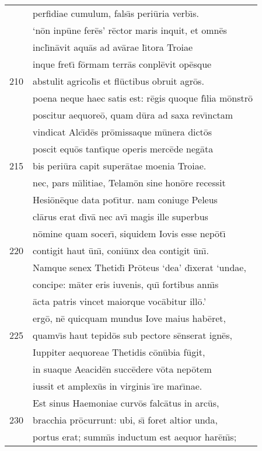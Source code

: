 \documentclass[paper=6in:9in,pagesize=pdftex,
               headinclude=on,footinclude=on,12pt]{scrbook}
\begin{document}
\begin{longtable}[p]{ r l }
 & perfidiae cumulum, fals\={\i}s peri\=uria verb\={\i}s.\\ 
 & `n\=on inp\=une fer\=es' r\=ector maris inquit, et omn\=es\\ 
 & incl\={\i}n\=avit aqu\=as ad av\=arae l\={\i}tora Troiae\\ 
 & inque fret\={\i} f\=ormam terr\=as conpl\=evit op\=esque\\ 
210 & abstulit agricol\={\i}s et fl\=uctibus obruit agr\=os.\\ 
 & poena neque haec satis est: r\=egis quoque f\={\i}lia m\=onstr\=o\\ 
 & poscitur aequore\=o, quam d\=ura ad saxa rev\={\i}nctam\\ 
 & vindicat Alc\={\i}d\=es pr\=omissaque m\=unera dict\=os\\ 
 & poscit equ\=os tant\={\i}que operis merc\=ede neg\=ata\\ 
215 & bis peri\=ura capit super\=atae moenia Troiae.\\ 
 & nec, pars m\={\i}litiae, Telam\=on sine hon\=ore recessit\\ 
 & Hesi\=on\=eque data pot\={\i}tur. nam coniuge Peleus\\ 
 & cl\=arus erat d\={\i}v\=a nec av\={\i} magis ille superbus\\ 
 & n\=omine quam socer\={\i}, siquidem Iovis esse nep\=ot\={\i}\\ 
220 & contigit haut \=un\={\i}, coni\=unx dea contigit \=un\={\i}.\\ 
 & \indent Namque senex Thetid\={\i} Pr\=oteus `dea' d\={\i}xerat `undae,\\ 
 & concipe: m\=ater eris iuvenis, qu\={\i} fortibus ann\={\i}s\\ 
 & \=acta patris vincet maiorque voc\=abitur ill\=o.'\\ 
 & erg\=o, n\=e quicquam mundus Iove maius hab\=eret,\\ 
225 & quamv\={\i}s haut tepid\=os sub pectore s\=enserat ign\=es,\\ 
 & Iuppiter aequoreae Thetidis c\=on\=ubia f\=ugit,\\ 
 & in suaque Aeacid\=en succ\=edere v\=ota nep\=otem\\ 
 & iussit et amplex\=us in virginis \={\i}re mar\={\i}nae.\\ 
 & \indent Est sinus Haemoniae curv\=os falc\=atus in arc\=us,\\ 
230 & bracchia pr\=ocurrunt: ubi, s\={\i} foret altior unda,\\ 
 & portus erat; summ\={\i}s inductum est aequor har\=en\={\i}s;\\ 

\end{longtable}
\end{document}
